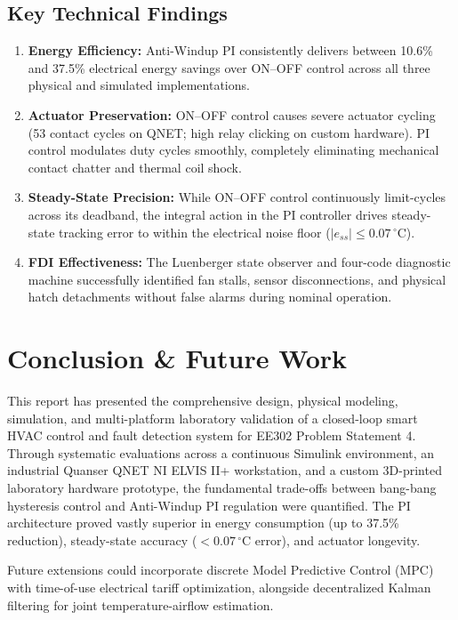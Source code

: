 \documentclass[conference]{IEEEtran}
\begin{document}
\subsection{Key Technical Findings}
\begin{enumerate}
    \item \textbf{Energy Efficiency:} Anti-Windup PI consistently delivers between 10.6\% and 37.5\% electrical energy savings over ON--OFF control across all three physical and simulated implementations.
    \item \textbf{Actuator Preservation:} ON--OFF control causes severe actuator cycling (53 contact cycles on QNET; high relay clicking on custom hardware). PI control modulates duty cycles smoothly, completely eliminating mechanical contact chatter and thermal coil shock.
    \item \textbf{Steady-State Precision:} While ON--OFF control continuously limit-cycles across its deadband, the integral action in the PI controller drives steady-state tracking error to within the electrical noise floor ($|e_{ss}| \le 0.07\,^\circ\text{C}$).
    \item \textbf{FDI Effectiveness:} The Luenberger state observer and four-code diagnostic machine successfully identified fan stalls, sensor disconnections, and physical hatch detachments without false alarms during nominal operation.
\end{enumerate}

\section{Conclusion \& Future Work}
This report has presented the comprehensive design, physical modeling, simulation, and multi-platform laboratory validation of a closed-loop smart HVAC control and fault detection system for EE302 Problem Statement 4. Through systematic evaluations across a continuous Simulink environment, an industrial Quanser QNET NI ELVIS II+ workstation, and a custom 3D-printed laboratory hardware prototype, the fundamental trade-offs between bang-bang hysteresis control and Anti-Windup PI regulation were quantified. The PI architecture proved vastly superior in energy consumption (up to 37.5\% reduction), steady-state accuracy ($<0.07\,^\circ\text{C}$ error), and actuator longevity. 

Future extensions could incorporate discrete Model Predictive Control (MPC) with time-of-use electrical tariff optimization, alongside decentralized Kalman filtering for joint temperature-airflow estimation.
\end{document}
